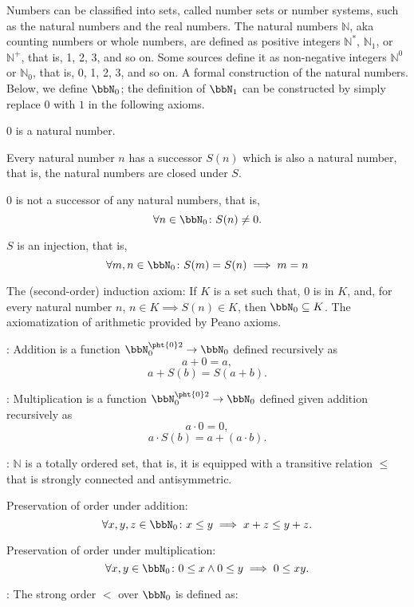 \documentclass[a4paper,12pt]{report}
\begin{document}
Numbers can be classified into sets, called number sets or number systems, such as the natural numbers and the real numbers.
The natural numbers $\mathbb{N}$, aka counting numbers or whole numbers, are defined as positive integers $\mathbb{N}^*$, $\mathbb{N}_1$, or $\mathbb{N}^+$, that is, 1, 2, 3, and so on. Some sources define it as non-negative integers $\mathbb{N}^0$ or $\mathbb{N}_0$, that is, 0, 1, 2, 3, and so on.
A formal construction of the natural numbers. Below, we define $\bbN_0$; the definition of $\bbN_1$ can be constructed by simply replace $0$ with $1$ in the following axioms.
\bit
\item $0$ is a natural number.
\item Every natural number $n$ has a successor $S(n)$ which is also a natural number, that is, the natural numbers are closed under $S$.
\item $0$ is not a successor of any natural numbers, that is,
\[\forall n\in\bbN_0\colon S(n)\neq 0.\]
\item $S$ is an injection, that is,
\[\forall m,n\in\bbN_0\colon S(m)=S(n)\implies m=n\]
\eit
\item The (second-order) induction axiom: If $K$ is a set such that, $0$ is in $K$, and, for every natural number $n$, $n\in K\implies S(n)\in K$, then $\bbN_0\subseteq K$.
\eit
{}
The axiomatization of arithmetic provided by Peano axioms.
\bit
\item {}: Addition is a function $\bbN_0^{\pht{0}2}\to\bbN_0$ defined recursively as
\[a+0=a,\]
\[a+S(b)=S(a+b).\]
\item {}: Multiplication is a function $\bbN_0^{\pht{0}2}\to\bbN_0$ defined given addition recursively as
\[a\cdot 0=0,\]
\[a\cdot S(b)=a+(a\cdot b).\]
\item {}: $\mathbb{N}$ is a totally ordered set, that is, it is equipped with a transitive relation $\leq$ that is strongly connected and antisymmetric.
\bit
\item Preservation of order under addition:
\[\forall x,y,z\in\bbN_0\colon x\leq y\implies x+z\leq y+z.\]
\item Preservation of order under multiplication:
\[\forall x,y\in\bbN_0\colon 0\leq x\land 0\leq y\implies 0\leq xy.\]
\eit
\item {}: The strong order $<$ over $\bbN_0$ is defined as:
\end{document}

